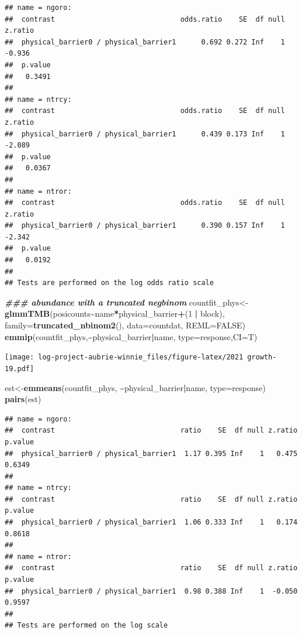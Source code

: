 \documentclass[
]{article}
\newenvironment{Shaded}{\begin{snugshade}}{\end{snugshade}}
\newcommand{\AttributeTok}[1]{\textcolor[rgb]{0.13,0.29,0.53}{#1}}
\newcommand{\ConstantTok}[1]{\textcolor[rgb]{0.56,0.35,0.01}{#1}}
\newcommand{\DecValTok}[1]{\textcolor[rgb]{0.00,0.00,0.81}{#1}}
\newcommand{\DocumentationTok}[1]{\textcolor[rgb]{0.56,0.35,0.01}{\textbf{\textit{#1}}}}
\newcommand{\FunctionTok}[1]{\textcolor[rgb]{0.13,0.29,0.53}{\textbf{#1}}}
\newcommand{\NormalTok}[1]{#1}
\newcommand{\OtherTok}[1]{\textcolor[rgb]{0.56,0.35,0.01}{#1}}
\newcommand{\SpecialCharTok}[1]{\textcolor[rgb]{0.81,0.36,0.00}{\textbf{#1}}}
\newcommand{\StringTok}[1]{\textcolor[rgb]{0.31,0.60,0.02}{#1}}
\begin{document}
\begin{verbatim}
## name = ngoro:
##  contrast                              odds.ratio    SE  df null z.ratio
##  physical_barrier0 / physical_barrier1      0.692 0.272 Inf    1  -0.936
##  p.value
##   0.3491
## 
## name = ntrcy:
##  contrast                              odds.ratio    SE  df null z.ratio
##  physical_barrier0 / physical_barrier1      0.439 0.173 Inf    1  -2.089
##  p.value
##   0.0367
## 
## name = ntror:
##  contrast                              odds.ratio    SE  df null z.ratio
##  physical_barrier0 / physical_barrier1      0.390 0.157 Inf    1  -2.342
##  p.value
##   0.0192
## 
## Tests are performed on the log odds ratio scale
\end{verbatim}

\begin{Shaded}
\begin{Highlighting}[]
\DocumentationTok{\#\#\# abundance with a truncated negbinom }
\NormalTok{countfit\_phys}\OtherTok{\textless{}{-}}\FunctionTok{glmmTMB}\NormalTok{(posicounts}\SpecialCharTok{\textasciitilde{}}\NormalTok{name}\SpecialCharTok{*}\NormalTok{physical\_barrier}\SpecialCharTok{+}\NormalTok{(}\DecValTok{1} \SpecialCharTok{|}\NormalTok{ block), }\AttributeTok{family=}\FunctionTok{truncated\_nbinom2}\NormalTok{(), }\AttributeTok{data=}\NormalTok{countdat, }\AttributeTok{REML=}\ConstantTok{FALSE}\NormalTok{)}
\FunctionTok{emmip}\NormalTok{(countfit\_phys,}\SpecialCharTok{\textasciitilde{}}\NormalTok{physical\_barrier}\SpecialCharTok{|}\NormalTok{name, }\AttributeTok{type=}\StringTok{\textquotesingle{}response\textquotesingle{}}\NormalTok{,}\AttributeTok{CI=}\NormalTok{T)}
\end{Highlighting}
\end{Shaded}

\texttt{[image: log-project-aubrie-winnie\_files/figure-latex/2021 growth-19.pdf]}

\begin{Shaded}
\begin{Highlighting}[]
\NormalTok{est}\OtherTok{\textless{}{-}}\FunctionTok{emmeans}\NormalTok{(countfit\_phys, }\SpecialCharTok{\textasciitilde{}}\NormalTok{physical\_barrier}\SpecialCharTok{|}\NormalTok{name, }\AttributeTok{type=}\StringTok{\textquotesingle{}response\textquotesingle{}}\NormalTok{)}
\FunctionTok{pairs}\NormalTok{(est)}
\end{Highlighting}
\end{Shaded}

\begin{verbatim}
## name = ngoro:
##  contrast                              ratio    SE  df null z.ratio p.value
##  physical_barrier0 / physical_barrier1  1.17 0.395 Inf    1   0.475  0.6349
## 
## name = ntrcy:
##  contrast                              ratio    SE  df null z.ratio p.value
##  physical_barrier0 / physical_barrier1  1.06 0.333 Inf    1   0.174  0.8618
## 
## name = ntror:
##  contrast                              ratio    SE  df null z.ratio p.value
##  physical_barrier0 / physical_barrier1  0.98 0.388 Inf    1  -0.050  0.9597
## 
## Tests are performed on the log scale
\end{verbatim}
\end{document}

